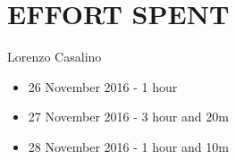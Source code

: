 \section{EFFORT SPENT}

	Lorenzo Casalino

	\begin{itemize}
		\item 26 November 2016 - 1 hour
		\item 27 November 2016 - 3 hour and 20m
		\item 28 November 2016 - 1 hour and 10m
	\end{itemize}


